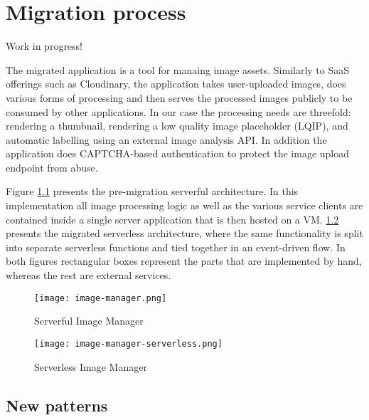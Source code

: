 \chapter{Migration process}

Work in progress!


The migrated application is a tool for manaing image assets. Similarly to SaaS offerings such as Cloudinary, the application takes user-uploaded images, does various forms of processing and then serves the processed images publicly to be consumed by other applications. In our case the processing needs are threefold: rendering a thumbnail, rendering a low quality image placeholder (LQIP), and automatic labelling using an external image analysis API. In addition the application does CAPTCHA-based authentication to protect the image upload endpoint from abuse.

Figure \ref{fig:imageManager} presents the pre-migration serverful architecture. In this implementation all image processing logic as well as the various service clients are contained inside a single server application that is then hosted on a VM. \ref{fig:serverlessImageManager} presents the migrated serverless architecture, where the same functionality is split into separate serverless functions and tied together in an event-driven flow. In both figures rectangular boxes represent the parts that are implemented by hand, whereas the rest are external services.

\begin{figure}[h]
  \centering
  \texttt{[image: image-manager.png]}
  \caption{Serverful Image Manager}
  \label{fig:imageManager}
\end{figure}

\begin{figure}[h]
  \centering
  \texttt{[image: image-manager-serverless.png]}
  \caption{Serverless Image Manager}
  \label{fig:serverlessImageManager}
\end{figure}

\section{New patterns} \label{sec:newPatterns}

